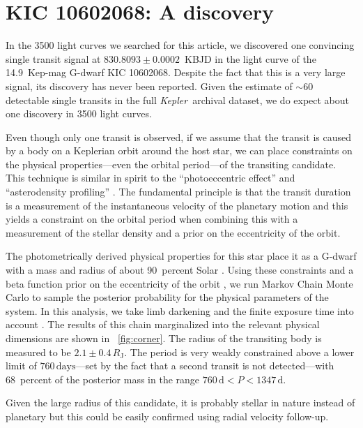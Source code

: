 \documentclass[12pt,preprint]{aastex}
\newcommand{\project}[1]{\textsl{#1}}
\newcommand{\kepler}{\project{Kepler}}
\newcommand{\paper}{article}
\newcommand{\figref}[1]{\ref{fig:#1}}
\newcommand{\Fig}[1]{\figurename~\figref{#1}}
\newcommand{\fig}[1]{\Fig{#1}}
\newcommand{\sectlabel}[1]{\label{sect:#1}}
\newcommand{\period}{{\ensuremath{P}}}
\begin{document}
\section{KIC 10602068: A discovery}\sectlabel{params}

In the 3500 light curves we searched for this \paper, we discovered one
convincing single transit signal at $830.8093\pm0.0002$~KBJD in the light
curve of the 14.9~Kep-mag G-dwarf KIC 10602068.
Despite the fact that this is a very large signal, its discovery has never
been reported.
Given the estimate of $\sim 60$ detectable single transits in the full
\kepler\ archival dataset, we do expect about one discovery in 3500 light
curves.

Even though only one transit is observed, if we assume that the transit is
caused by a body on a Keplerian orbit around the host star, we can place
constraints on the physical properties---even the orbital period---of the
transiting candidate.
This technique is similar in spirit to the ``photoeccentric effect''
\citep{Dawson:2012} and ``asterodensity profiling'' \citep{Kipping:2012}.
The fundamental principle is that the transit duration is a measurement of
the instantaneous velocity of the planetary motion and this yields a
constraint on the orbital period when combining this with a measurement of the
stellar density and a prior on the eccentricity of the orbit.

The photometrically derived physical properties for this star place it as a
G-dwarf with a mass and radius of about 90~percent Solar \citep{Huber:2014}.
Using these constraints and a beta function prior on the eccentricity of the
orbit \citep{Kipping:2013a}, we run Markov Chain Monte Carlo
\citep{Foreman-Mackey:2013} to sample the posterior probability for the
physical parameters of the system.
In this analysis, we take limb darkening and the finite exposure time into
account \citep{Mandel:2002, Kipping:2010, Kipping:2013}.
The results of this chain marginalized into the relevant physical dimensions
are shown in \fig{corner}.
The radius of the transiting body is measured to be $2.1 \pm
0.4\,R_\mathrm{J}$.
The period is very weakly constrained above a lower limit of
$760\,\mathrm{days}$---set by the fact that a second transit is not
detected---with 68~percent of the posterior mass in the range $760\,\mathrm{d}
< \period < 1347\,\mathrm{d}$.

Given the large radius of this candidate, it is probably stellar in nature
instead of planetary but this could be easily confirmed using radial velocity
follow-up.
\end{document}
